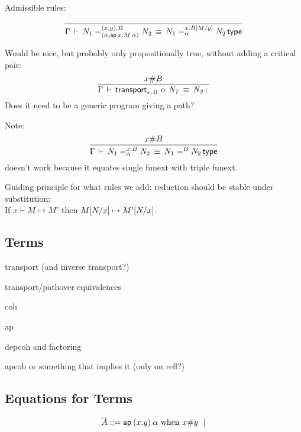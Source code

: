 Admissible rules:

\[
\infer{\deqtp{\Gamma}{\iidover{(x,y).B}{(\alpha,\ap{x.M}{\alpha})}{N_1}{N_2}}
                     {\iidover{x.\subst{B}{M}{y}}{\alpha}{N_1}{N_2}}}
      {}
\]

Would be nice, but probably only propositionally true, without adding a
critical pair:
\[
\infer{\deqtm{\Gamma}{\transport{x.B}{\alpha}{N_1}}
                     {N_2}}
      {x \# B}
\]
Does it need to be a generic program giving a path?


Note:
\[
\infer{\deqtp{\Gamma}{\iidover{x.B}{\alpha}{N_1}{N_2}}
                     {\iid{B}{N_1}{N_2}}}
      {x \# B}
\]
doesn't work because it equates single funext with triple funext.  

Guiding principle for what rules we add:
reduction should be stable under substitution: \\
If $x \vdash M \mapsto M'$ then $M [ N / x] \mapsto
M' [ N / x]$.  

\subsection{Terms}

transport (and inverse transport?)

transport/pathover equivalences

coh

ap

depcoh and factoring

apcoh or something that implies it (only on refl?)

\subsection{Equations for Terms}

\begin{small}
\[
\begin{array}{l}
\overline{A} ::= \mathsf{ap} \: {(x.y)} \: {\alpha} \text{ when $x \# y$ } \mid \\
\end{array}
\]
\end{small}

